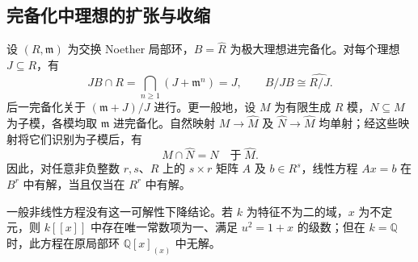 \subsection{完备化中理想的扩张与收缩}
\label{b3:subsec:1305:03}

\begin{proposition}\label{b3:prop:completion-ideal-contraction}
	设 \((R,\mathfrak m)\) 为交换 Noether 局部环，\(B=\widehat R\) 为极大理想进完备化。对每个理想 \(J\subseteq R\)，有
	\[
		JB\cap R=\bigcap_{n\ge1}(J+\mathfrak m^n)=J, \qquad B/JB\cong\widehat{R/J}.
	\]
	后一完备化关于 \((\mathfrak m+J)/J\) 进行。更一般地，设 \(M\) 为有限生成 \(R\) 模，\(N\subseteq M\) 为子模，各模均取 \(\mathfrak m\) 进完备化。自然映射 \(M\to\widehat M\) 及 \(\widehat N\to\widehat M\) 均单射；经这些映射将它们识别为子模后，有
	\[
		M\cap\widehat N=N\quad\text{于}\;\widehat M.
	\]
	因此，对任意非负整数 \(r,s\)、\(R\) 上的 \(s\times r\) 矩阵 \(A\) 及 \(b\in R^s\)，线性方程 \(Ax=b\) 在 \(B^r\) 中有解，当且仅当在 \(R^r\) 中有解。

	一般非线性方程没有这一可解性下降结论。若 \(k\) 为特征不为二的域，\(x\) 为不定元，则 \(k[\![x]\!]\) 中存在唯一常数项为一、满足 \(u^2=1+x\) 的级数；但在 \(k=\mathbb Q\) 时，此方程在原局部环 \(\mathbb Q[x]_{(x)}\) 中无解。
\end{proposition}

